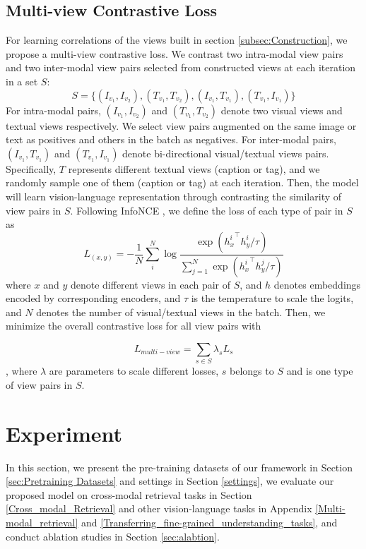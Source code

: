 \documentclass{article}
\begin{document}
\subsection{Multi-view Contrastive Loss}
\label{subsec:Objectives}
For learning correlations of the views built in section \ref{subsec:Construction}, we propose a multi-view contrastive loss. We contrast two intra-modal view pairs and two inter-modal view pairs selected from constructed views at each iteration in a set $S$:  
$$S= \{(I_{v_1},I_{v_2}),(T_{v_1},T_{v_2}), (I_{v_1},T_{v_1}),(T_{v_1},I_{v_1})\}$$
For intra-modal pairs, $(I_{v_1},I_{v_2})$ and $(T_{v_1},T_{v_2})$ denote two visual views and textual views respectively. We select view pairs augmented on the same image or text as positives and others in the batch as negatives. For inter-modal pairs, $(I_{v_1},T_{v_1})$ and $(T_{v_1},I_{v_1})$ denote bi-directional visual/textual views pairs. Specifically, $T$ represents different textual views (caption or tag), and we randomly sample one of them (caption or tag) at each iteration. Then, the model will learn vision-language representation through contrasting the similarity of view pairs in $S$. Following InfoNCE \cite{Oord2018RepresentationLW}, we define the loss of each type of pair in $S$ as
\begin{equation}
L_{(x,y)}=-\frac{1}{N}\sum_{i}^{N}\log\frac{\exp( {h_{x}^{i}}^\top h_{y}^{i}/\tau)}{\sum_{j=1}^{N}\exp({h_{x}^{i}}^\top h_{y}^{j}/\tau)}
\end{equation}
where $x$ and $y$ denote different views in each pair of $S$, and $h$ denotes embeddings encoded by corresponding encoders, and $\tau$ is the temperature to scale the logits, and $N$ denotes the number of visual/textual views in the batch. Then, we minimize the overall contrastive loss for all view pairs with 

\begin{equation}
L_{multi-view}= \sum_{s \in S} \lambda_s L_{s}
\end{equation}
, where $\lambda$ are parameters to scale different losses, $s$ belongs to $S$ and is one type of view pairs in $S$.

\section{Experiment}
\label{sec:Experiment}
In this section, we present the pre-training datasets of our framework in Section \ref{sec:Pretraining Datasets} and settings in Section \ref{settings}, we evaluate our proposed model on cross-modal retrieval tasks in Section \ref{Cross_modal_Retrieval} and other vision-language tasks in Appendix \ref{Multi-modal_retrieval} and \ref{Transferring_fine-grained_understanding_tasks}, and conduct ablation studies in Section \ref{sec:alabtion}.
\end{document}
